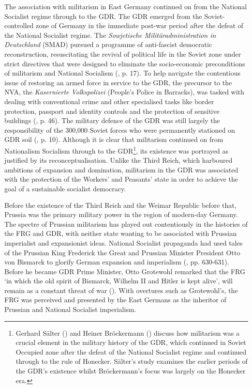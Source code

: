 The association with militarism in East Germany continued on from the National Socialist regime through to the GDR. The GDR emerged from the Soviet-controlled zone of Germany in the immediate post-war period after the defeat of the National Socialist regime. The \textit{Sowjetische Militäradministration in Deutschland} (SMAD) pursued a programme of anti-fascist democratic reconstruction, resuscitating the revival of political life in the Soviet zone under strict directives that were designed to eliminate the socio-economic preconditions of militarism and National Socialism (\cite{dennis2000}, p. 17). To help navigate the contentious issue of restoring an armed force in service to the GDR, the precursor to the NVA, the \textit{Kasernierte Volkspolizei} (People’s Police in Barracks), was tasked with dealing with conventional crime and other specialised tasks like border protection, passport and identity controls and the protection of sensitive buildings (\cite{fullbrook1995}, p. 46). The military defence of the GDR was still largely the responsibility of the 300,000 Soviet forces who were permanently stationed on GDR soil (\cite{fullbrook1995}, p. 10). Although it is clear that militarism continued on from Nationalism Socialism through to the GDR\footnote{Gerhard Sälter (\citeyear{sälter2009}) and Heiner Bröckermann (\citeyear{bröckermann2011}) discuss how militarism was a crucial element in the military history of the GDR, which continued in Soviet Occupied zone after the defeat of the National Socialist regime and continued through to the rule of Honecker. Sälter’s study examines the earlier periods of the GDR’s existence whilst Bröckermann’s focus was largely on the Honecker era.}, its existence was portrayed as justified by its reconceptualisation. Unlike the Third Reich, which harboured ambitions of expansion and domination, militarism in the GDR was associated with the protection of the Workers’ and Peasants’ state in order to achieve the goal of a sustainable socialist democracy.

Before the existence of the Third Reich and the Weimar Republic before that, Prussia was the primary military power in the region of modern-day Germany. The spectre of Prussian militarism has played out contentiously in the histories of the FRG and GDR, with neither state wanting to be associated with Prussian imperialist and expansionist ideas. National Socialist propaganda had used tales of the Prussian King Frederick the Great and Prussian Minister President Otto von Bismarck to glorify German expansion and imperialism (\cite{kroll2001}, pp. 630-631). Before he became GDR Prime Minister, Otto Grotewohl remarked that the FRG ‘in which the old spirit of Bismarck, Wilhelm II and Hitler is kept alive’, will remain as a constant threat of war (\cite{nd19490320}). With overtures such as Grotewohl’s, the FRG was perceived and presented by the East Germans as the inheritor of Prussian and National Socialist imperialism.

